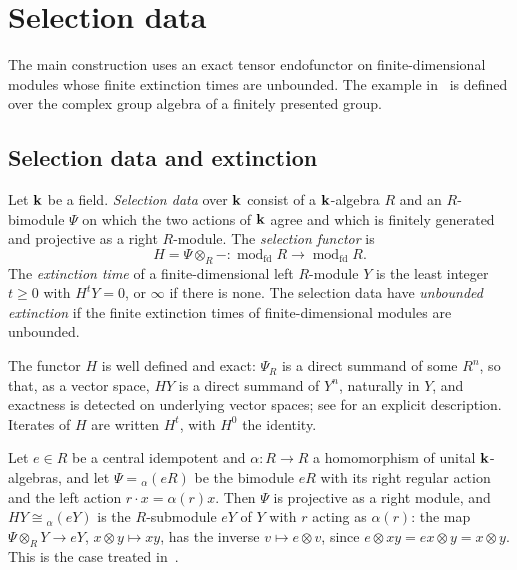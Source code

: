 \section{Selection data}
\label{sec:selection}

The main construction uses an exact tensor endofunctor on finite-dimensional
modules whose finite extinction times are unbounded. The example
in~\cite[Section~2]{OAI26findim} is defined over the complex group algebra of a
finitely presented group.

\subsection{Selection data and extinction}
\label{subsec:selection-data}

\begin{definition}
  \label{def:selection-data}
  Let $\mathbf{k}$ be a field. \emph{Selection data} over $\mathbf{k}$ consist of a
  $\mathbf{k}$-algebra $R$ and an $R$-bimodule $\Psi$ on which the two actions of
  $\mathbf{k}$ agree and which is finitely generated and projective as a right
  $R$-module. The \emph{selection functor} is
  \[
    H=\Psi\otimes_R-\colon\operatorname{mod}_{\mathrm{fd}}R\longrightarrow
    \operatorname{mod}_{\mathrm{fd}}R.
  \]
  The \emph{extinction time} of a
  finite-dimensional left $R$-module $Y$ is the least integer ${t\geq0}$ with
  ${H^tY=0}$, or $\infty$ if there is none. The selection data have
  \emph{unbounded extinction} if the finite extinction times of
  finite-dimensional modules are unbounded.
\end{definition}

The functor $H$ is well defined and exact: $\Psi_R$ is a direct summand of some
$R^n$, so that, as a vector space, $HY$ is a direct summand of $Y^n$, naturally
in $Y$, and exactness is detected on underlying vector spaces; see
 for an explicit description. Iterates of $H$ are
written $H^t$, with $H^0$ the identity.

\begin{example}
  \label{ex:twisted-corner}
  Let ${e\in R}$ be a central idempotent and ${\alpha\colon R\to R}$ a homomorphism
  of unital $\mathbf{k}$-algebras, and let ${\Psi={}_\alpha(eR)}$ be the bimodule $eR$
  with its right regular action and the left action ${r\cdot x=\alpha(r)x}$.
  Then $\Psi$ is projective as a right module, and ${HY\cong{}_\alpha(eY)}$ is
  the $R$-submodule $eY$ of $Y$ with $r$ acting as $\alpha(r)$: the map
  ${\Psi\otimes_RY\to eY}$, ${x\otimes y\mapsto xy}$, has the inverse
  ${v\mapsto e\otimes v}$, since ${e\otimes xy=ex\otimes y=x\otimes y}$. This is
  the case treated in~\cite[Section~2]{OAI26findim}.
\end{example}

